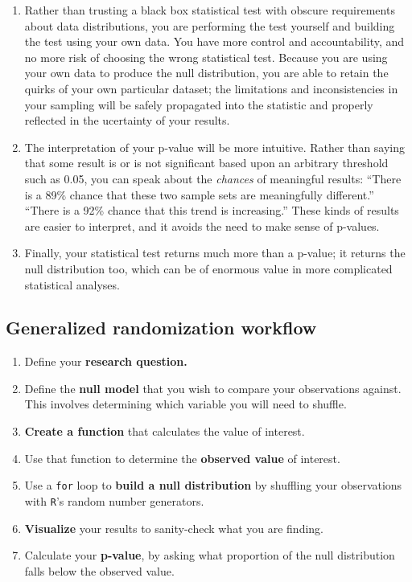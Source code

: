 \documentclass[
]{book}
\begin{document}
\begin{enumerate}
\def\labelenumi{\arabic{enumi}.}
\item
  Rather than trusting a black box statistical test with obscure requirements about data distributions, you are performing the test yourself and building the test using your own data. You have more control and accountability, and no more risk of choosing the wrong statistical test. Because you are using your own data to produce the null distribution, you are able to retain the quirks of your own particular dataset; the limitations and inconsistencies in your sampling will be safely propagated into the statistic and properly reflected in the ucertainty of your results.
\item
  The interpretation of your p-value will be more intuitive. Rather than saying that some result is or is not significant based upon an arbitrary threshold such as 0.05, you can speak about the \emph{chances} of meaningful results: ``There is a 89\% chance that these two sample sets are meaningfully different.'' ``There is a 92\% chance that this trend is increasing.'' These kinds of results are easier to interpret, and it avoids the need to make sense of p-values.
\item
  Finally, your statistical test returns much more than a p-value; it returns the null distribution too, which can be of enormous value in more complicated statistical analyses.
\end{enumerate}

\hypertarget{generalized-randomization-workflow}{%
\subsection*{Generalized randomization workflow}\label{generalized-randomization-workflow}}

\begin{enumerate}
\def\labelenumi{\arabic{enumi}.}
\item
  Define your \textbf{research question.}
\item
  Define the \textbf{null model} that you wish to compare your observations against. This involves determining which variable you will need to shuffle.
\item
  \textbf{Create a function} that calculates the value of interest.
\item
  Use that function to determine the \textbf{observed value} of interest.
\item
  Use a \texttt{for} loop to \textbf{build a null distribution} by shuffling your observations with \texttt{R}'s random number generators.
\item
  \textbf{Visualize} your results to sanity-check what you are finding.
\item
  Calculate your \textbf{p-value}, by asking what proportion of the null distribution falls below the observed value.
\end{enumerate}
\end{document}
